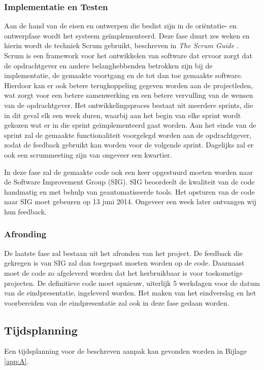 \subsubsection{Implementatie en Testen}
Aan de hand van de eisen en ontwerpen die beslist zijn in de ori\"entatie- en ontwerpfase wordt het systeem ge\"implementeerd. Deze fase duurt zes weken en hierin wordt de techniek Scrum gebruikt, beschreven in \emph{The Scrum Guide} \cite{schwaber2011}. Scrum is een framework voor het ontwikkelen van software dat ervoor zorgt dat de opdrachtgever en andere belanghebbenden betrokken zijn bij de implementatie, de gemaakte voortgang en de tot dan toe gemaakte software. Hierdoor kan er ook betere terugkoppeling gegeven worden aan de projectleden, wat zorgt voor een betere samenwerking en een betere vervulling van de wensen van de opdrachtgever. Het ontwikkelingsproces bestaat uit meerdere sprints, die in dit geval elk een week duren, waarbij aan het begin van elke sprint wordt gekozen wat er in die sprint ge\"implementeerd gaat worden. Aan het einde van de sprint zal de gemaakte functionaliteit voorgelegd worden aan de opdrachtgever, zodat de feedback gebruikt kan worden voor de volgende sprint. Dagelijks zal er ook een scrummeeting zijn van ongeveer een kwartier.

In deze fase zal de gemaakte code ook een keer opgestuurd moeten worden naar de Software Improvement Group (SIG). SIG beoordeelt de kwaliteit van de code handmatig en met behulp van geautomatiseerde tools. Het opsturen van de code naar SIG moet gebeuren op 13 juni 2014. Ongeveer een week later ontvangen wij hun feedback.

\subsubsection{Afronding}
De laatste fase zal bestaan uit het afronden van het project. De feedback die gekregen is van SIG zal dan toegepast moeten worden op de code. Daarnaast moet de code zo afgeleverd worden dat het herbruikbaar is voor toekomstige projecten. De definitieve code moet opnieuw, uiterlijk 5 werkdagen voor de datum van de eindpresentatie, ingeleverd worden. Het maken van het eindverslag en het voorbereiden van de eindpresentatie zal ook in deze fase gedaan worden.

\subsection{Tijdsplanning}
Een tijdsplanning voor de beschreven aanpak kan gevonden worden in Bijlage \ref{app:A}.
